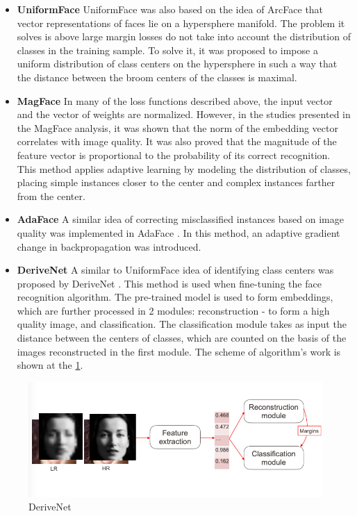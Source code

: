 \documentclass[11pt,a4paper]{article}
\begin{document}
\begin{itemize}
\item{\bf{UniformFace}}
UniformFace \cite{uniformface} was also based on the idea of ArcFace  \cite{arcface}that vector representations of faces lie on a hypersphere manifold. The problem it solves is above large margin losses do not take into account the distribution of classes in the training sample. To solve it, it was proposed to impose a uniform distribution of class centers on the hypersphere in such a way that the distance between the broom centers of the classes is maximal.
\item{\bf{MagFace}}
In many of the loss functions described above, the input vector and the vector of weights are normalized. However, in the studies presented in the MagFace \cite{magface} analysis, it was shown that the norm of the embedding vector correlates with image quality. It was also proved that the magnitude of the feature vector is proportional to the probability of its correct recognition. This method applies adaptive learning by modeling the distribution of classes, placing simple instances closer to the center and complex instances farther from the center. 
\item{\bf{AdaFace}}
A similar idea of correcting misclassified instances based on image quality was implemented in AdaFace \cite{adaface}. In this method, an adaptive gradient change in backpropagation was introduced. 
\item{\bf{DeriveNet}}
A similar to UniformFace idea of identifying class centers was proposed by DeriveNet \cite{derivenet}. This method is used when fine-tuning the face recognition algorithm. The pre-trained model is used to form embeddings, which are further processed in 2 modules: reconstruction - to form a high quality image, and classification. The classification module takes as input the distance between the centers of classes, which are counted on the basis of the images reconstructed in the first module. The scheme of algorithm's work is shown at the \ref{fig:derivenet}.
\end{itemize}
\begin{figure}[ht!]
    \centering
    \includegraphics[width=\textwidth]{derivenet.png}
    \caption{DeriveNet}
    \label{fig:derivenet}
\end{figure}
\end{document}
